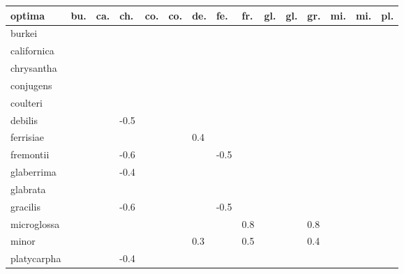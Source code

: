 \begin{table}[ht]
\centering
\begin{tabular}{lllllllllllllll}
  \hline
optima & bu. & ca. & ch. & co. & co. & de. & fe. & fr. & gl. & gl. & gr. & mi. & mi. & pl. \\ 
  \hline
burkei &  &  &  &  &  &  &  &  &  &  &  &  &  &  \\ 
  californica &  &  &  &  &  &  &  &  &  &  &  &  &  &  \\ 
  chrysantha &  &  &  &  &  &  &  &  &  &  &  &  &  &  \\ 
  conjugens &  &  &  &  &  &  &  &  &  &  &  &  &  &  \\ 
  coulteri &  &  &  &  &  &  &  &  &  &  &  &  &  &  \\ 
  debilis &  &  & -0.5 &  &  &  &  &  &  &  &  &  &  &  \\ 
  ferrisiae &  &  &  &  &  & 0.4 &  &  &  &  &  &  &  &  \\ 
  fremontii &  &  & -0.6 &  &  &  & -0.5 &  &  &  &  &  &  &  \\ 
  glaberrima &  &  & -0.4 &  &  &  &  &  &  &  &  &  &  &  \\ 
  glabrata &  &  &  &  &  &  &  &  &  &  &  &  &  &  \\ 
  gracilis &  &  & -0.6 &  &  &  & -0.5 &  &  &  &  &  &  &  \\ 
  microglossa &  &  &  &  &  &  &  & 0.8 &  &  & 0.8 &  &  &  \\ 
  minor &  &  &  &  &  & 0.3 &  & 0.5 &  &  & 0.4 &  &  &  \\ 
  platycarpha &  &  & -0.4 &  &  &  &  &  &  &  &  &  &  &  \\ 
   \hline
\end{tabular}
\end{table}
